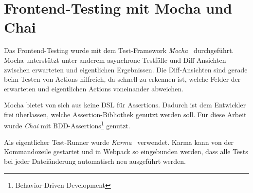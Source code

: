\section{Frontend-Testing mit Mocha und Chai}
\label{sec:t_frontend_testing_mit_mocha_und_chai'}

Das Frontend-Testing wurde mit dem Test-Framework \emph{Mocha}~\cite{mocha}
durchgeführt.  Mocha unterstützt unter anderem asynchrone Testfälle und
Diff-Ansichten zwischen erwarteten und eigentlichen Ergebnissen.
Die Diff-Ansichten sind gerade beim Testen von Actions hilfreich, da schnell zu
erkennen ist, welche Felder der erwarteten und eigentlichen Actions voneinander
abweichen.

Mocha bietet von sich aus keine DSL für Assertions.  Dadurch ist dem Entwickler
frei überlassen, welche Assertion-Bibliothek genutzt werden soll.  Für diese
Arbeit wurde \emph{Chai} mit BDD-Assertions\footnote{Behavior-Driven
Development} genutzt.

Als eigentlicher Test-Runner wurde \emph{Karma}~\cite{karma} verwendet.  Karma
kann von der Kommandozeile gestartet und in Webpack so eingebunden werden, dass
alle Tests bei jeder Dateiänderung automatisch neu ausgeführt werden.



